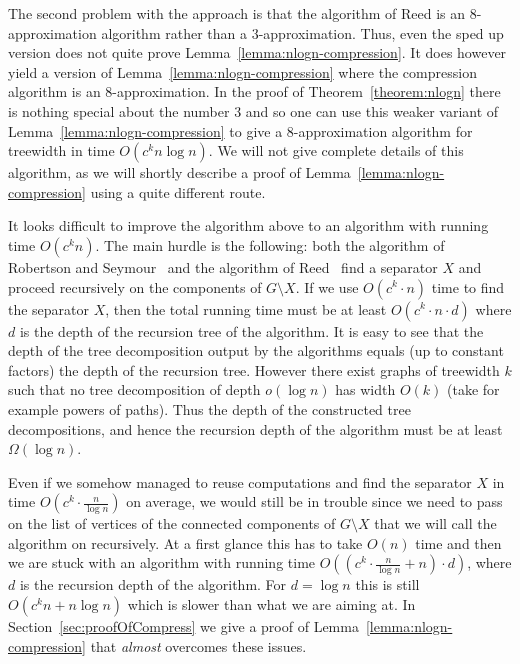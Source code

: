 \documentclass[a4paper,11pt]{article}
\theoremstyle{definition}
\theoremstyle{remark}
\begin{document}
\smallskip

The second problem with the approach is that the algorithm of Reed is
an $8$-approximation algorithm rather than a $3$-approximation.  Thus,
even the sped up version does not quite prove
Lemma~\ref{lemma:nlogn-compression}.  It does however yield a version
of Lemma~\ref{lemma:nlogn-compression} where the compression algorithm
is an $8$-approximation.  In the proof of Theorem~\ref{theorem:nlogn}
there is nothing special about the number $3$ and so one can use this
weaker variant of Lemma~\ref{lemma:nlogn-compression} to give a
$8$-approximation algorithm for treewidth in time $O(c^kn \log n)$.
We will not give complete details of this algorithm, as we will
shortly describe a proof of Lemma~\ref{lemma:nlogn-compression} using
a quite different route.

It looks difficult to improve the algorithm above to an algorithm with
running time $O(c^kn)$.  The main hurdle is the following: both the
algorithm of Robertson and Seymour~\cite{RobertsonS13} and the
algorithm of Reed~\cite{Reed92} find a separator $X$ and proceed
recursively on the components of $G \setminus X$.  If we use $O(c^k
\cdot n)$ time to find the separator $X$, then the total running time
must be at least $O(c^k \cdot n \cdot d)$ where $d$ is the depth of
the recursion tree of the algorithm.  It is easy to see that the depth
of the tree decomposition output by the algorithms equals (up to
constant factors) the depth of the recursion tree.  However there
exist graphs of treewidth $k$ such that no tree decomposition of depth
$o(\log n)$ has width $O(k)$ (take for example powers of paths).  Thus
the depth of the constructed tree decompositions, and hence the
recursion depth of the algorithm must be at least $\Omega(\log n)$.

Even if we somehow managed to reuse computations and find the
separator $X$ in time $O(c^k \cdot \frac{n}{\log n})$ on average, we
would still be in trouble since we need to pass on the list of
vertices of the connected components of $G \setminus X$ that we will
call the algorithm on recursively.  At a first glance this has to take
$O(n)$ time and then we are stuck with an algorithm with running time
$O((c^k \cdot \frac{n}{\log n} + n) \cdot d)$, where $d$ is the
recursion depth of the algorithm.  For $d = \log n$ this is still
$O(c^kn + n\log n)$ which is slower than what we are aiming at.  In
Section~\ref{sec:proofOfCompress} we give a proof of
Lemma~\ref{lemma:nlogn-compression} that {\em almost} overcomes these
issues.
\end{document}
